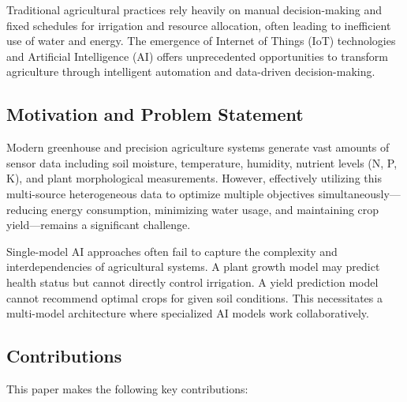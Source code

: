 \documentclass[conference]{IEEEtran}
\begin{document}
Traditional agricultural practices rely heavily on manual decision-making and fixed schedules for irrigation and resource allocation, often leading to inefficient use of water and energy. The emergence of Internet of Things (IoT) technologies and Artificial Intelligence (AI) offers unprecedented opportunities to transform agriculture through intelligent automation and data-driven decision-making.

\subsection{Motivation and Problem Statement}

Modern greenhouse and precision agriculture systems generate vast amounts of sensor data including soil moisture, temperature, humidity, nutrient levels (N, P, K), and plant morphological measurements. However, effectively utilizing this multi-source heterogeneous data to optimize multiple objectives simultaneously—reducing energy consumption, minimizing water usage, and maintaining crop yield—remains a significant challenge.

Single-model AI approaches often fail to capture the complexity and interdependencies of agricultural systems. A plant growth model may predict health status but cannot directly control irrigation. A yield prediction model cannot recommend optimal crops for given soil conditions. This necessitates a multi-model architecture where specialized AI models work collaboratively.

\subsection{Contributions}

This paper makes the following key contributions:
\end{document}
